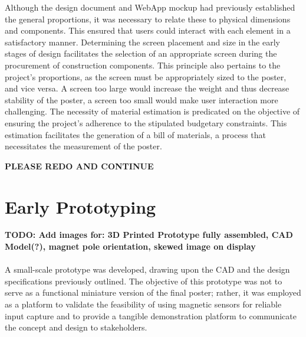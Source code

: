 Although the design document and WebApp mockup had previously established the general proportions, it was necessary to relate these to physical dimensions and components. This ensured that users could interact with each element in a satisfactory manner.
Determining the screen placement and size in the early stages of design facilitates the selection of an appropriate screen during the procurement of construction components. This principle also pertains to the project's proportions, as the screen must be appropriately sized to the poster, and vice versa. A screen too large would increase the weight and thus decrease stability of the poster, a screen too small would make user interaction more challenging.
The necessity of material estimation is predicated on the objective of ensuring the project's adherence to the stipulated budgetary constraints. This estimation facilitates the generation of a bill of materials, a process that necessitates the measurement of the poster.


\textbf{PLEASE REDO AND CONTINUE}



 
\section{Early Prototyping}

\textbf{TODO: Add images for: 3D Printed Prototype fully assembled, CAD Model(?), magnet pole orientation, skewed image on display}\\\\

	A small-scale prototype was developed, drawing upon the CAD and the design specifications previously outlined. The objective of this prototype was not to serve as a functional miniature version of the final poster; rather, it was employed as a platform to validate the feasibility of using magnetic sensors for reliable input capture and to provide a tangible demonstration platform to communicate the concept and design to stakeholders.
	
